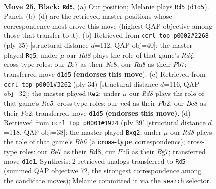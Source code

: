 \documentclass[11pt]{article}
\begin{document}
\clearpage

\begin{figure}[p]\centering
\begin{subfigure}{0.46\textwidth}\centering
\resizebox{\linewidth}{!}{%
\newchessgame
\chessboard[
  setfen={rnb5/1p1nb1k1/p3ppp1/7p/2N5/1P2P1P1/P1B1PK1P/R1BrR3 b - - 0 25},
  showmover=false,
  pgfstyle=straightmove, color=movearrow, markmove={d1-d5}
]}
\caption{}
\end{subfigure}\hfill
\begin{subfigure}{0.46\textwidth}\centering
\resizebox{\linewidth}{!}{%
\newchessgame
\chessboard[
  setfen={r3n1k1/pp2bppp/4b3/1Nnr4/P1NBp3/2P5/1PK1BPPP/R2R4 b - - 2 18},
  showmover=false,
  pgfstyle=straightmove, color=movearrow, markmove={d5-g5}
]}
\caption{}
\end{subfigure}
\\[4pt]
\begin{subfigure}{0.46\textwidth}\centering
\resizebox{\linewidth}{!}{%
\newchessgame
\chessboard[
  setfen={rr2b1k1/p3ppbp/2p3p1/3nR3/N7/1B5P/PPPB1PP1/R5K1 w - - 1 18},
  showmover=false,
  pgfstyle=straightmove, color=movearrow, markmove={e5-e2}
]}
\caption{}
\end{subfigure}\hfill
\begin{subfigure}{0.46\textwidth}\centering
\resizebox{\linewidth}{!}{%
\newchessgame
\chessboard[
  setfen={r2r2k1/4ppbp/5np1/p2pN3/3B4/1P4Pb/P1R1PPBP/5RK1 b - - 0 20},
  showmover=false,
  pgfstyle=straightmove, color=movearrow, markmove={h3-g2}
]}
\caption{}
\end{subfigure}
\caption{\textbf{Move 25, Black: \texttt{Rd5}.} (a) Our position; Melanie plays \texttt{Rd5} (\texttt{d1d5}). Panels (b)--(d) are the retrieved master positions whose correspondence most drove this move (highest QAP objective among those that transfer to it). (b) Retrieved from \texttt{ccrl\_top\_p0002\#2268} (ply 35) [structural distance $d$=112, QAP obj=40]: the master played \texttt{Rg5}; under $\mu$ our \emph{Rd8} plays the role of that game's \emph{Rd4}; cross-type roles: our \emph{B}e7 as their \emph{N}e8, our \emph{R}a8 as their \emph{P}b7; transferred move \texttt{d1d5} \textbf{(endorses this move)}. (c) Retrieved from \texttt{ccrl\_top\_p0001\#3262} (ply 34) [structural distance $d$=116, QAP obj=32]: the master played \texttt{Re2}; under $\mu$ our \emph{Rd8} plays the role of that game's \emph{Re5}; cross-type roles: our \emph{n}c4 as their \emph{P}b2, our \emph{B}c8 as their \emph{P}c2; transferred move \texttt{d1d5} \textbf{(endorses this move)}. (d) Retrieved from \texttt{ccrl\_top\_p0001\#1924} (ply 39) [structural distance $d$=118, QAP obj=38]: the master played \texttt{Bxg2}; under $\mu$ our \emph{Rd8} plays the role of that game's \emph{Bh6} (a \textbf{cross-type} correspondence); cross-type roles: our \emph{B}e7 as their \emph{R}d8, our \emph{P}h5 as their \emph{B}g7; transferred move \texttt{d1e1}. Synthesis: 2 retrieved analogs transferred to \texttt{Rd5} (summed QAP objective 72, the strongest correspondence among the candidate moves); Melanie committed it via the \texttt{search} selector.}
\label{fig:thought-m49}
\end{figure}
\end{document}
